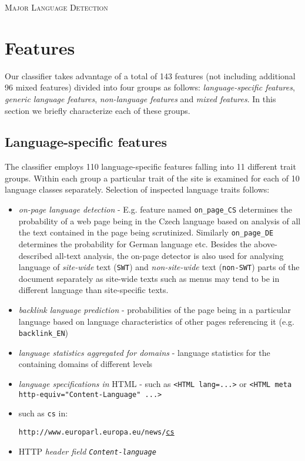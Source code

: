 \documentclass[12pt,a4paper]{article}     %
\begin{document}
  \begin{center}  
    \textsc{\Large Major Language Detection}
  \end{center}

  \section{Features}
  Our classifier takes advantage of a total of 143 features (not including additional 96 mixed features) divided into four groups
  as follows: \textit{language-specific features}, \textit{generic language features}, \textit{non-language
  features} and \textit{mixed features}. In this section we briefly characterize each of these
  groups.

  \subsection{Language-specific features}

  The classifier employs 110 language-specific features falling into 11 different trait groups. Within each group a
  particular trait of the site is examined for each of 10 language classes separately. Selection of
  inspected language traits follows: 
  \begin{itemize}
    \item \textit{on-page language detection} - E.g. feature named \texttt{on\_page\_CS} determines the
      probability of a web page being in the Czech language based on analysis of all the text
      contained in the page being scrutinized. Similarly \texttt{on\_page\_DE} determines the
      probability for German language etc. Besides the above-described all-text analysis, the on-page 
      detector is also used for analysing language of \textit{site-wide} text (\texttt{SWT}) and
    \textit{non-site-wide} text (\texttt{non-SWT}) parts of the document separately as site-wide texts 
      such as menus may tend to be in different language than site-specific texts.
    \item \textit{backlink language prediction} - probabilities of the page being in a particular
      language based on language characteristics of other pages referencing it (e.g.
      \texttt{backlink\_EN})
    \item \textit{language statistics aggregated for domains} - language statistics for the
      containing domains of different levels
    \item \textit{language specifications in} HTML - such as \texttt{<HTML lang=...>} or \texttt{<HTML
      meta http-equiv="Content-Language" ...>}
    \item {} such as \texttt{cs} in:

    \texttt{http://www.europarl.europa.eu/news/}\underline{\texttt{cs}} 
    \item HTTP \textit{header field \texttt{Content-language}}
  \end{itemize}
\end{document}
